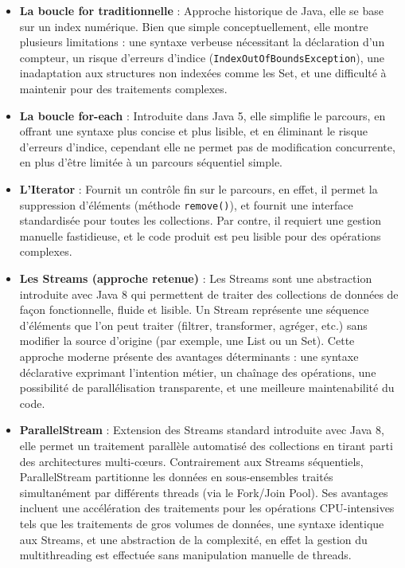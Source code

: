 \documentclass[12pt,a4paper]{report}
\begin{document}
	\begin{itemize}
		
		\item \textbf{La boucle for traditionnelle} : Approche historique de Java, elle se base sur un index numérique. Bien que simple conceptuellement, elle montre plusieurs limitations : une syntaxe verbeuse nécessitant la déclaration d'un compteur, un risque d'erreurs d'indice (\verb|IndexOutOfBoundsException|), une inadaptation aux structures non indexées comme les Set, et une difficulté à maintenir pour des traitements complexes.
		
		\item \textbf{La boucle for-each} : Introduite dans Java 5, elle simplifie le parcours, en offrant une syntaxe plus concise et plus lisible, et en éliminant le risque d'erreurs d'indice, cependant elle ne permet pas de modification concurrente, en plus d'être limitée à un parcours séquentiel simple.
		
		\item \textbf{L'Iterator} : Fournit un contrôle fin sur le parcours, en effet, il permet la suppression d'éléments (méthode \verb|remove()|), et fournit une interface standardisée pour toutes les collections. Par contre, il requiert une gestion manuelle fastidieuse, et le code produit est peu lisible pour des opérations complexes.
		
		\item \textbf{Les Streams (approche retenue)} :  Les Streams sont une abstraction introduite avec Java 8 qui permettent de traiter des collections de données de façon fonctionnelle, fluide et lisible. Un Stream représente une séquence d’éléments que l’on peut traiter (filtrer, transformer, agréger, etc.) sans modifier la source d’origine (par exemple, une List ou un Set). Cette approche moderne présente des avantages déterminants : une syntaxe déclarative exprimant l'intention métier, un chaînage des opérations, une possibilité de parallélisation transparente, et une meilleure maintenabilité du code. \cite{stream}
		
		\item \textbf{ParallelStream} : Extension des Streams standard introduite avec Java 8, elle permet un traitement parallèle automatisé des collections en tirant parti des architectures multi-cœurs. Contrairement aux Streams séquentiels, ParallelStream partitionne les données en sous-ensembles traités simultanément par différents threads (via le Fork/Join Pool). Ses avantages incluent une accélération des traitements pour les opérations CPU-intensives tels que les traitements de gros volumes de données, une syntaxe identique aux Streams, et une abstraction de la complexité, en effet la gestion du multithreading est effectuée sans manipulation manuelle de threads.
		
	\end{itemize}
	
\end{document}
